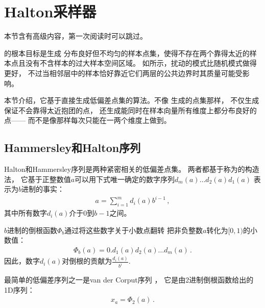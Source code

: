 \section{Halton采样器}\label{sec:Halton采样器}
\begin{remark}
    本节含有高级内容，第一次阅读时可以跳过。
\end{remark}

的根本目标是生成
分布良好但不均匀的样本点集，使得不存在两个靠得太近的样本点且没有不含样本的过大样本空间区域。
如所示，扰动的模式比随机模式做得更好，
不过当相邻层中的样本恰好靠近它们两层的公共边界时其质量可能受影响。

本节介绍，它基于直接生成低偏差点集的算法。不像\linebreak
{}生成的点集那样，
不仅生成保证不会靠得太近抱团的点，
还生成能同时在样本向量所有维度上都分布良好的点——
而不是像那样每次只能在一两个维度上做到。

\subsection{Hammersley和Halton序列}\label{sub:Hammersley和Halton序列}
Halton和Hammersley序列是两种紧密相关的低偏差点集。
两者都基于称为的构造法，
它基于正整数值$a$可以用下式唯一确定的数字序列$d_m(a)\ldots d_2(a)d_1(a)$
表示为$b$进制的事实：
\begin{align}
    \label{eq:7.6}
    a=\sum\limits_{i=1}^m{d_i(a)b^{i-1}}\, ,
\end{align}
其中所有数字$d_i(a)$介于0到$b-1$之间。

$b$进制的倒根函数$\varPhi_b$通过将这些数字关于小数点翻转
把非负整数$a$转化为$[0,1)$的小数值：
\begin{align}
    \label{eq:7.7}
    \varPhi_b(a)=0.d_1(a)d_2(a)\ldots d_m(a)\, .
\end{align}
因此，数字$d_i(a)$对倒根的贡献为$\displaystyle\frac{d_i(a)}{b^i}$.

最简单的低偏差序列之一是van der Corput序列
，
它是由2进制倒根函数给出的1D序列：
\begin{align*}
    x_a=\varPhi_2(a)\, .
\end{align*}

